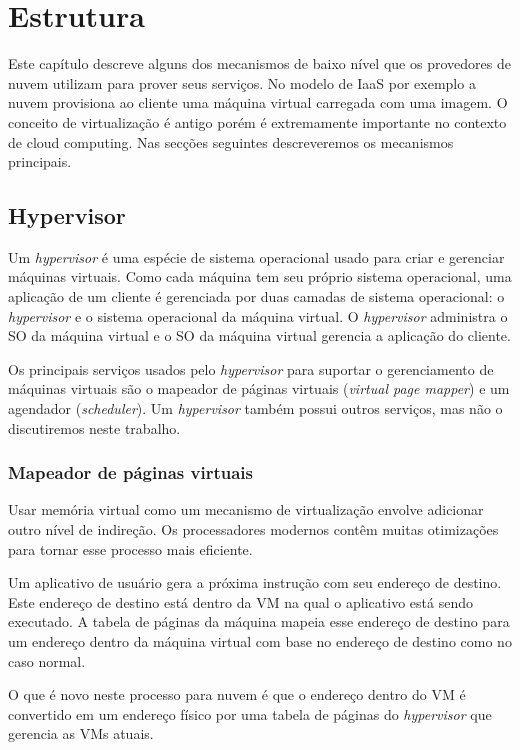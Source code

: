 \chapter{Estrutura}
	Este capítulo descreve alguns dos mecanismos de baixo nível que os provedores de nuvem utilizam para prover seus serviços. No modelo de IaaS por exemplo a nuvem provisiona ao cliente uma máquina virtual carregada com uma imagem. O conceito de virtualização é antigo porém é extremamente importante no contexto de cloud computing. Nas secções seguintes descreveremos os mecanismos principais.


	\section{Hypervisor}
	Um \textit{hypervisor} é uma espécie de sistema operacional usado para criar e gerenciar máquinas virtuais. Como cada máquina tem seu próprio sistema operacional, uma aplicação de um cliente é gerenciada por duas camadas de sistema operacional: o \textit{hypervisor} e o sistema operacional da máquina virtual. O \textit{hypervisor} administra o SO da máquina virtual e o SO da máquina virtual gerencia a aplicação do cliente. 

	Os principais serviços usados pelo \textit{hypervisor} para suportar o gerenciamento de máquinas virtuais são o mapeador de páginas virtuais (\textit{virtual page mapper}) e um agendador (\textit{scheduler}). Um \textit{hypervisor} também possui outros serviços, mas não o discutiremos neste trabalho.

	\subsection{Mapeador de páginas virtuais}	
	Usar memória virtual como um mecanismo de virtualização envolve adicionar outro nível de indireção. Os processadores modernos contêm muitas otimizações para tornar esse processo mais
	eficiente. 

	Um aplicativo de usuário gera a próxima instrução com seu endereço de destino. Este endereço de destino está dentro da VM na qual o aplicativo está sendo executado. A tabela de páginas da máquina mapeia esse endereço de destino para um endereço dentro da máquina virtual com base no endereço de destino como no caso normal. 

	O que é novo neste processo para nuvem é que o endereço dentro do VM é convertido em um endereço físico por uma tabela de páginas do \textit{hypervisor} que gerencia as VMs atuais.

